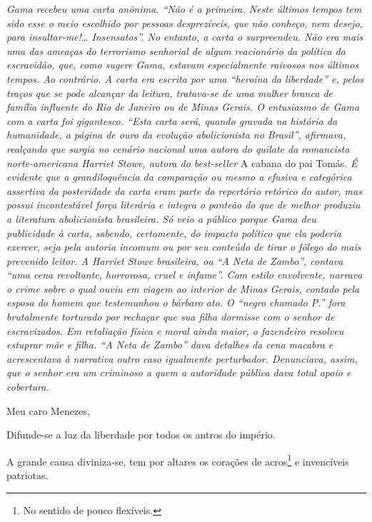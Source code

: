 \begin{resumo}
\emph{Gama recebeu uma carta anônima. ``Não é a primeira. Neste últimos
tempos tem sido esse o meio escolhido por pessoas desprezíveis, que não
conheço, nem desejo, para insultar-me!\ldots{} Insensatos''. No entanto, a
carta o surpreendeu. Não era mais uma das ameaças do terrorismo
senhorial de algum reacionário da política da escravidão, que, como
sugere Gama, estavam especialmente raivosos nos últimos tempos. Ao
contrário. A carta era escrita por uma ``heroína da liberdade'' e, pelos
traços que se pode alcançar da leitura, tratava-se de uma mulher branca
de família influente do Rio de Janeiro ou de Minas Gerais. O entusiasmo
de Gama com a carta foi gigantesco. ``Esta carta será, quando gravada na
história da humanidade, a página de ouro da evolução abolicionista no
Brasil'', afirmava, realçando que surgia no cenário nacional uma autora
do quilate da romancista norte-americana Harriet Stowe, autora do
best-seller} A cabana do pai Tomás. \emph{É evidente que a
grandiloquência da comparação ou mesmo a efusiva e categórica assertiva
da posteridade da carta eram parte do repertório retórico do autor, mas
possui incontestável força
literária e integra o panteão do que de melhor produziu a literatura
abolicionista brasileira. Só veio a público porque Gama deu publicidade à
carta, sabendo, certamente, do impacto político que ela poderia exercer,
seja pela autoria incomum ou por seu conteúdo de tirar o fôlego do mais
prevenido leitor. A Harriet Stowe brasileira, ou ``A Neta de Zambo'',
contava ``uma cena revoltante, horrorosa, cruel e infame''. Com estilo
envolvente, narrava o crime sobre o qual ouviu em viagem ao interior de Minas Gerais, contado pela esposa do homem que
testemunhou o bárbaro ato. O ``negro chamado P.''
fora brutalmente torturado por rechaçar que sua filha dormisse com o
senhor de escravizados. Em retaliação física e moral ainda maior, o
fazendeiro resolveu estuprar mãe e filha. ``A Neta de Zambo'' dava
detalhes da cena macabra e acrescentava à narrativa outro caso
igualmente perturbador. Denunciava, assim, que o senhor era um
criminoso a quem a autoridade pública dava total apoio e cobertura.}
\end{resumo}\pagebreak

Meu caro Menezes,

Difunde-se a luz da liberdade por todos os antros do império.

A grande causa diviniza-se, tem por altares os corações de
acros\footnote{No sentido de pouco flexíveis.} e invencíveis
patriotas.

